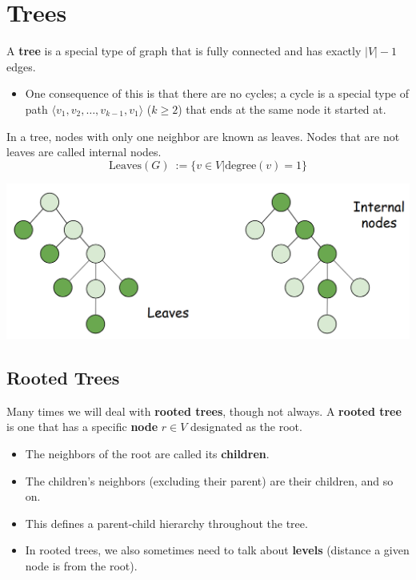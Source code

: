 \documentclass[10pt]{article}
\begin{document}
\section*{Trees}
A \textbf{tree} is a special type of graph that is fully connected and has exactly $|V| - 1$ edges.
\begin{itemize}
	\item One consequence of this is that there are no cycles; a cycle is a special type of path $\langle v_1, v_2, \dots, v_{k - 1}, v_1\rangle$ ($k \geq 2$) that ends at the same node it started at.
\end{itemize}
In a tree, nodes with only one neighbor are known as leaves.  Nodes that are not leaves are called internal nodes.
\[\text{Leaves}(G) \::= \{v \in V | \text{degree}(v) = 1\}\]
\begin{center} 
	\includegraphics*[width=\textwidth]{M4_7.png} 
\end{center}

\subsection*{Rooted Trees}
Many times we will deal with \textbf{rooted trees}, though not always.  A \textbf{rooted tree} is one that has a specific \textbf{node} $r \in V$ designated as the root.
\begin{itemize}
	\item The neighbors of the root are called its \textbf{children}.
	\item The children's neighbors (excluding their parent) are their children, and so on.
	\item This defines a parent-child hierarchy throughout the tree.
	\item In rooted trees, we also sometimes need to talk about \textbf{levels} (distance a given node is from the root).
\end{itemize}
\end{document}
